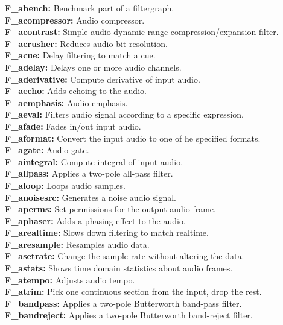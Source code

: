 \noindent \textbf{F\_abench:} Benchmark part of a filtergraph.\\
\textbf{F\_acompressor:} Audio compressor.\\
\textbf{F\_acontrast:} Simple audio dynamic range compression/expansion filter.\\
\textbf{F\_acrusher:} Reduces audio bit resolution.\\
\textbf{F\_acue:} Delay filtering to match a cue.\\
\textbf{F\_adelay:} Delays one or more audio channels. \\
\textbf{F\_aderivative:} Compute derivative of input audio.\\
\textbf{F\_aecho:} Adds echoing to the audio.\\
\textbf{F\_aemphasis:} Audio emphasis.\\
\textbf{F\_aeval:} Filters audio signal according to a specific expression.\\
\textbf{F\_afade:} Fades in/out input audio. \\
\textbf{F\_aformat:} Convert the input audio to one of he specified formats.\\
\textbf{F\_agate:} Audio gate.\\
\textbf{F\_aintegral:} Compute integral of input audio.\\
\textbf{F\_allpass:} Applies a two-pole all-pass filter.\\
\textbf{F\_aloop:} Loops audio samples.\\
\textbf{F\_anoisesrc:} Generates a noise audio signal.\\
\textbf{F\_aperms:} Set permissions for the output audio frame.\\
\textbf{F\_aphaser:} Adds a phasing effect to the audio.\\
\textbf{F\_arealtime:} Slows down filtering to match realtime.\\
\textbf{F\_aresample:} Resamples audio data.\\
\textbf{F\_asetrate:} Change the sample rate without altering the data.\\
\textbf{F\_astats:} Shows time domain statistics about audio frames.\\
\textbf{F\_atempo:} Adjusts audio tempo.\\
\textbf{F\_atrim:} Pick one continuous section from the input, drop the rest.\\
\textbf{F\_bandpass:} Applies a two-pole Butterworth band-pass filter.\\
\textbf{F\_bandreject:} Applies a two-pole Butterworth band-reject filter.\\
